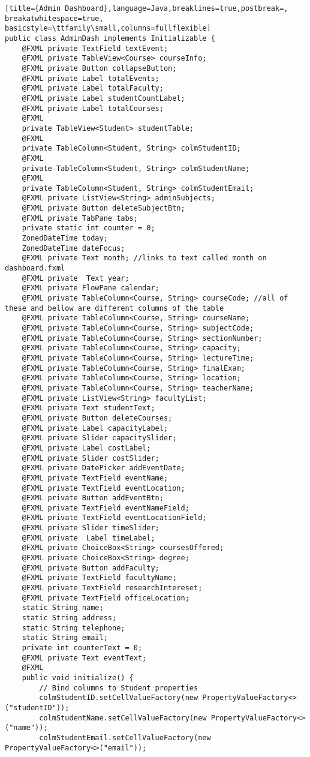 \begin{lstlisting}[title={Admin Dashboard},language=Java,breaklines=true,postbreak=, breakatwhitespace=true, basicstyle=\ttfamily\small,columns=fullflexible]
public class AdminDash implements Initializable {
    @FXML private TextField textEvent;
    @FXML private TableView<Course> courseInfo;
    @FXML private Button collapseButton;
    @FXML private Label totalEvents;
    @FXML private Label totalFaculty;
    @FXML private Label studentCountLabel;
    @FXML private Label totalCourses;
    @FXML
    private TableView<Student> studentTable;
    @FXML
    private TableColumn<Student, String> colmStudentID;
    @FXML
    private TableColumn<Student, String> colmStudentName;
    @FXML
    private TableColumn<Student, String> colmStudentEmail;
    @FXML private ListView<String> adminSubjects;
    @FXML private Button deleteSubjectBtn;
    @FXML private TabPane tabs;
    private static int counter = 0;
    ZonedDateTime today;
    ZonedDateTime dateFocus;
    @FXML private Text month; //links to text called month on dashboard.fxml
    @FXML private  Text year;
    @FXML private FlowPane calendar;
    @FXML private TableColumn<Course, String> courseCode; //all of these and bellow are different columns of the table
    @FXML private TableColumn<Course, String> courseName;
    @FXML private TableColumn<Course, String> subjectCode;
    @FXML private TableColumn<Course, String> sectionNumber;
    @FXML private TableColumn<Course, String> capacity;
    @FXML private TableColumn<Course, String> lectureTime;
    @FXML private TableColumn<Course, String> finalExam;
    @FXML private TableColumn<Course, String> location;
    @FXML private TableColumn<Course, String> teacherName;
    @FXML private ListView<String> facultyList;
    @FXML private Text studentText;
    @FXML private Button deleteCourses;
    @FXML private Label capacityLabel;
    @FXML private Slider capacitySlider;
    @FXML private Label costLabel;
    @FXML private Slider costSlider;
    @FXML private DatePicker addEventDate;
    @FXML private TextField eventName;
    @FXML private TextField eventLocation;
    @FXML private Button addEventBtn;
    @FXML private TextField eventNameField;
    @FXML private TextField eventLocationField;
    @FXML private Slider timeSlider;
    @FXML private  Label timeLabel;
    @FXML private ChoiceBox<String> coursesOffered;
    @FXML private ChoiceBox<String> degree;
    @FXML private Button addFaculty;
    @FXML private TextField facultyName;
    @FXML private TextField researchIntereset;
    @FXML private TextField officeLocation;
    static String name;
    static String address;
    static String telephone;
    static String email;
    private int counterText = 0;
    @FXML private Text eventText;
    @FXML
    public void initialize() {
        // Bind columns to Student properties
        colmStudentID.setCellValueFactory(new PropertyValueFactory<>("studentID"));
        colmStudentName.setCellValueFactory(new PropertyValueFactory<>("name"));
        colmStudentEmail.setCellValueFactory(new PropertyValueFactory<>("email"));


\end{lstlisting}
